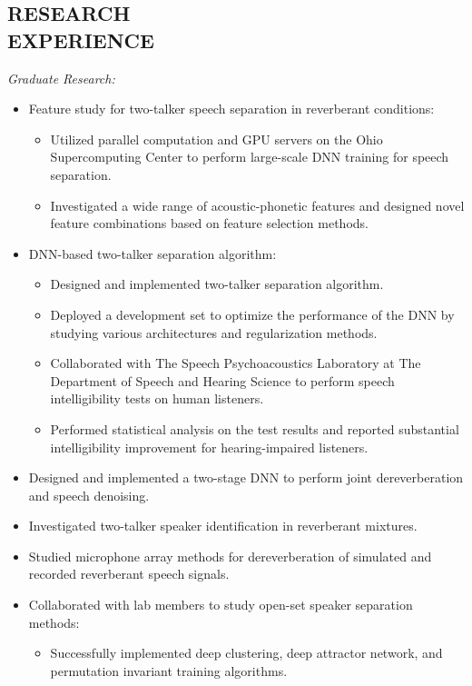 \documentclass[margin, 10pt]{res}
\begin{document}
\begin{resume}
\section{RESEARCH \\ EXPERIENCE}
\textit{Graduate Research:}
\begin{itemize}\setlength\itemsep{-0.3em}
\item Feature study for two-talker speech separation in reverberant conditions:
	\begin{itemize}\setlength\itemsep{-0.3em}
	\item Utilized parallel computation and GPU servers on the Ohio Supercomputing Center to perform large-scale DNN training for speech separation.
	\item Investigated a wide range of acoustic-phonetic features and designed novel feature combinations based on feature selection methods.
	\end{itemize}
\item DNN-based two-talker separation algorithm:
	\begin{itemize}\setlength\itemsep{-0.3em}
	\item Designed and implemented two-talker separation algorithm.
	\item Deployed a development set to optimize the performance of the DNN by studying various architectures and regularization methods.
	\item Collaborated with The Speech Psychoacoustics Laboratory at The Department of Speech and Hearing Science to perform speech intelligibility tests on human listeners.
	\item Performed statistical analysis on the test results and reported substantial intelligibility improvement for hearing-impaired listeners.
	\end{itemize}
\item Designed and implemented a two-stage DNN to perform joint dereverberation and speech denoising.
\item Investigated two-talker speaker identification in reverberant mixtures.
\item Studied microphone array methods for dereverberation of simulated and recorded reverberant speech signals.
\item Collaborated with lab members to study open-set speaker separation methods:
	\begin{itemize}\setlength\itemsep{-0.3em}
	\item Successfully implemented deep clustering, deep attractor network, and permutation invariant training algorithms.

\end{itemize}
\end{itemize}
\end{resume}
\end{document}
